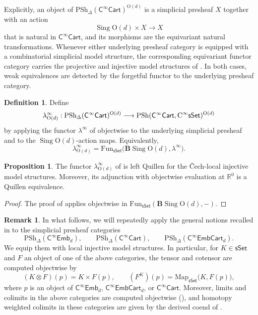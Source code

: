 \documentclass{amsart}
\newcommand{\cat}[1]{\mathsf{#1}}
\newcommand{\sset}{\cat{sSet}}
\DeclareMathOperator{\Sing}{Sing}
\newcommand{\CsSet}{\textnormal{C}^{\infty}\sset}
\newcommand{\Cart}{\cat{C}^{\infty}\cat{Cart}}
\newcommand{\fembnoniso}[1]{\cat{C}^{\infty}\cat{Emb}_{#1}}
\newcommand{\fembcartnoniso}[1]{\cat{C}^{\infty}\cat{EmbCart}_{#1}}
\newcommand{\Fun}{\mathrm{Fun}}
\newcommand{\Map}{\mathrm{Map}}
\newcommand{\psh}{\mathrm{PSh}}
\newcommand{\spsh}{\mathrm{PSh}_{\Delta}}
\newcommand{\RR}{{\mathbb{R}}}
\theoremstyle{definition}
\newtheorem{definition}[equation]{Definition}
\newtheorem{proposition}[equation]{Proposition}
\newtheorem{remark}[equation]{Remark}
\numberwithin{equation}{subsection}
\numberwithin{subsubsection}{subsection}
\begin{document}
Explicitly, an object of \(\spsh(\Cart)^{\mathrm{O}(d)}\) is a
simplicial presheaf \(X\) together with an action
\[
  \Sing\mathrm{O}(d)\times X\longrightarrow X
\]
that is natural in \(\Cart\), and its morphisms are the equivariant natural
transformations. Whenever either underlying presheaf category is equipped
with a combinatorial simplicial model structure, the corresponding equivariant
functor category carries the projective and injective model structures of
. In both cases, weak
equivalences are detected by the forgetful functor to the underlying presheaf
category.

\begin{definition}\label{def:equivariant.lambda}
  Define
  \[
    \lambda^{\infty}_{\mathrm{O}(d)}:
    \spsh(\Cart)^{\mathrm{O}(d)}
    \longrightarrow
    \psh(\Cart,\CsSet)^{\mathrm{O}(d)}
  \]
  by applying the functor \(\lambda^{\infty}\) of
   objectwise to the underlying simplicial
  presheaf and to the \(\Sing\mathrm{O}(d)\)-action maps.
  Equivalently,
  \[
    \lambda^{\infty}_{\mathrm{O}(d)}
    =
    \Fun_{\sset}\bigl(\mathbf{B}\Sing\mathrm{O}(d),\lambda^{\infty}\bigr).
  \]
\end{definition}

\begin{proposition}\label{prop:equivariant.lambda.left.quillen}
  The functor \(\lambda^{\infty}_{\mathrm{O}(d)}\) of
   is left Quillen for the \v{C}ech-local
  injective model structures. Moreover, its adjunction with objectwise
  evaluation at \(\RR^0\) is a Quillen equivalence.
\end{proposition}

\begin{proof}
  The proof of  applies objectwise in
  \(\Fun_{\sset}(\mathbf{B}\Sing\mathrm{O}(d),-)\).
\end{proof}

\begin{remark}\label{rem:presheaf.categories.for.Cartesian.realization}
  In what follows, we will repeatedly apply the general notions recalled in
  to the simplicial presheaf categories
  \[
    \spsh(\fembnoniso{d}), \qquad \spsh(\Cart), \qquad
    \spsh(\fembcartnoniso{d}).
  \]
  We equip them with local injective model structures. In particular, for
  \(K\in\sset\) and \(F\) an object of one of the above categories, the tensor
  and cotensor are computed objectwise by
  \[
    (K\otimes F)(p)=K\times F(p), \qquad
    (F^{K})(p)=\Map_{\sset}\bigl(K,F(p)\bigr),
  \]
  where \(p\) is an object of \(\fembnoniso{d}\), \(\fembcartnoniso{d}\), or
  \(\Cart\). Moreover, limits and colimits in the above categories are
  computed objectwise (), and
  homotopy weighted colimits in these categories are given by
  the derived coend of .
\end{remark}
\end{document}
